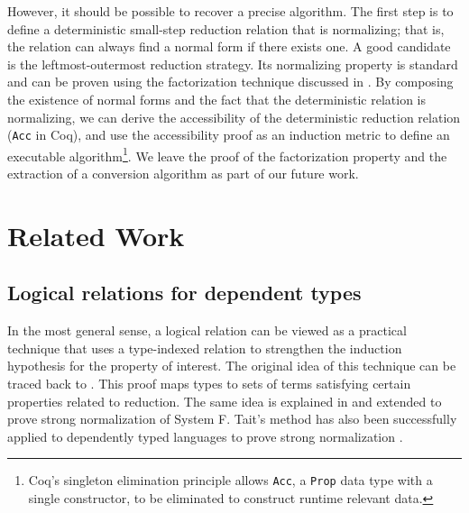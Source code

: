 \documentclass[\ifpublic nolinenum\else\fi,online,OA]{jfp}
\newcommand{\scw}[1]{}
\newcommand{\yl}[1]{}
\theoremstyle{definition}
\begin{document}
However, %
it should be possible to recover a
precise algorithm. The first step is to define a deterministic
small-step reduction relation that is normalizing; that is, the
relation can always find a normal form if there exists one. A good
candidate is the leftmost-outermost reduction strategy. Its
normalizing property is standard and can be proven using the
factorization technique discussed in
\citet{takahashi-parallel-reduction, factorization-essentially}. By
composing the existence of normal forms and the fact that the
deterministic relation is normalizing, we can derive the
accessibility of the deterministic reduction relation
(\texttt{Acc} in Coq), and use the accessibility proof as
an induction metric to define an executable algorithm\footnote{Coq's
  singleton elimination principle allows \texttt{Acc}, a
  \texttt{Prop} data type with a single constructor, to be eliminated
  to construct runtime relevant data.}. We leave the proof of the
factorization property and the extraction of a conversion algorithm as
part of our future work.
\fi
\section{Related Work}
\label{sec:relatedwork}


\subsection{Logical relations for dependent types}
In the most general sense, a logical relation can be viewed as a
practical technique that uses a type-indexed relation to 
strengthen the induction hypothesis for the
property of interest. The original idea of this technique can be
traced back to
\citet{tait1967:reducibility}. This proof maps
types to sets of terms satisfying certain properties related to reduction.
The same idea is explained in \citet{girard1989proofs} and extended to
prove strong normalization of System F.
%
Tait's method has also been successfully applied to dependently typed
languages to prove strong normalization \cite{Martin-Lof-1973,luo1990extended,geuvers1994short, barendregt:lambda-calculi-with-types}.
\end{document}
